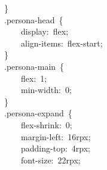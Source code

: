 \documentclass[a4paper,10pt]{article}
\begin{document}
{~~~~\}\\
~~~~.persona-head~\{\\
~~~~~~~~display:~flex;\\
~~~~~~~~align-items:~flex-start;\\
~~~~\}\\
~~~~.persona-main~\{\\
~~~~~~~~flex:~1;\\
~~~~~~~~min-width:~0;\\
~~~~\}\\
~~~~.persona-expand~\{\\
~~~~~~~~flex-shrink:~0;\\
~~~~~~~~margin-left:~16rpx;\\
~~~~~~~~padding-top:~4rpx;\\
~~~~~~~~font-size:~22rpx;
}

\newpage
\end{document}
